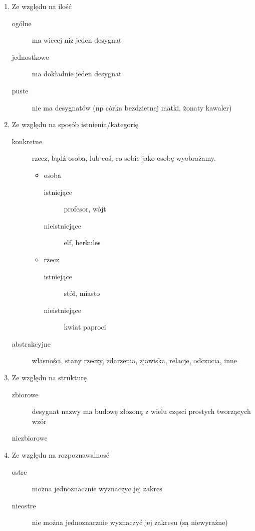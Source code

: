 \documentclass[11pt]{article}
\begin{document}
\begin{enumerate}
\item Ze względu na ilość
\label{sec:org0d4ed11}

\begin{description}
\item[{ogólne}] ma wiecej niz jeden desygnat
\item[{jednostkowe}] ma dokładnie jeden desygnat
\item[{puste}] nie ma desygnatów (np córka bezdzietnej matki, żonaty kawaler)
\end{description}

\item Ze względu na sposób istnienia/kategorię
\label{sec:orgcda854f}

\begin{description}
\item[{konkretne}] rzecz, bądź osoba, lub coś, co sobie jako osobę wyobrażamy.
\begin{itemize}
\item osoba
\begin{description}
\item[{istniejące}] profesor, wójt
\item[{nieistniejące}] elf, herkules
\end{description}
\item rzecz
\begin{description}
\item[{istniejące}] stół, miasto
\item[{nieistniejące}] kwiat paproci
\end{description}
\end{itemize}

\item[{abstrakcyjne}] własności, stany rzeczy, zdarzenia, zjawiska, relacje, odczucia, inne
\end{description}

\item Ze względu na strukturę
\label{sec:orgd1fb066}

\begin{description}
\item[{zbiorowe}] desygnat nazwy ma budowę złozoną z wielu częsci prostych tworzących wzór
\item[{niezbiorowe}] 
\end{description}

\item Ze względu na rozpoznawalnosć
\label{sec:org88f56a2}

\begin{description}
\item[{ostre}] można jednoznacznie wyznaczyc jej zakres
\item[{nieostre}] nie można jednoznacznie wyznaczyć jej zakresu (są niewyrażne)
\end{description}
\end{enumerate}
\end{document}
